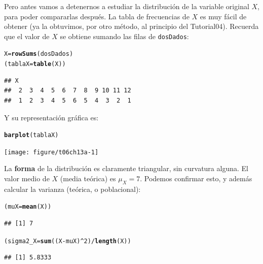 \documentclass[10pt,a4paper]{article}\usepackage[]{graphicx}\usepackage[]{color}
\makeatletter
\newcommand{\hlnum}[1]{\textcolor[rgb]{0.686,0.059,0.569}{#1}}%
\newcommand{\hlopt}[1]{\textcolor[rgb]{0,0,0}{#1}}%
\newcommand{\hlstd}[1]{\textcolor[rgb]{0.345,0.345,0.345}{#1}}%
\newcommand{\hlkwb}[1]{\textcolor[rgb]{0.69,0.353,0.396}{#1}}%
\newcommand{\hlkwd}[1]{\textcolor[rgb]{0.737,0.353,0.396}{\textbf{#1}}}%
\newenvironment{kframe}{%
 \def\at@end@of@kframe{}%
 \ifinner\ifhmode%
  \def\at@end@of@kframe{\end{minipage}}%
  \begin{minipage}{\columnwidth}%
 \fi\fi%
 \def\FrameCommand##1{\hskip\@totalleftmargin \hskip-\fboxsep
 \colorbox{shadecolor}{##1}\hskip-\fboxsep
     \hskip-\linewidth \hskip-\@totalleftmargin \hskip\columnwidth}%
 \MakeFramed {\advance\hsize-\width
   \@totalleftmargin\z@ \linewidth\hsize
   \@setminipage}}%
 {\par\unskip\endMakeFramed%
 \at@end@of@kframe}
\newenvironment{knitrout}{}{} %
\makeatother
\begin{document}
Pero antes vamos a detenernos a estudiar la distribución de la variable original $X$, para poder compararlas después. La tabla de frecuencias de $X$ es muy fácil de obtener (ya la obtuvimos, por otro método, al principio del Tutorial04). Recuerda que el valor de $X$ se obtiene sumando las filas de {\tt dosDados}:
\begin{knitrout}
\color{fgcolor}\begin{kframe}
\begin{alltt}
\hlstd{X} \hlkwb{=} \hlkwd{rowSums}\hlstd{(dosDados)}
\hlstd{(tablaX} \hlkwb{=} \hlkwd{table}\hlstd{(X))}
\end{alltt}
\begin{verbatim}
## X
##  2  3  4  5  6  7  8  9 10 11 12 
##  1  2  3  4  5  6  5  4  3  2  1
\end{verbatim}
\end{kframe}
\end{knitrout}
Y su representación gráfica es:
\begin{knitrout}
\color{fgcolor}\begin{kframe}
\begin{alltt}
\hlkwd{barplot}\hlstd{(tablaX)}
\end{alltt}
\end{kframe}
\texttt{[image: figure/t06ch13a-1]} 

\end{knitrout}
La {\bf forma} de la distribución es claramente triangular, sin curvatura alguna. El valor medio de $X$ (media teórica) es $\mu_X = 7$. Podemos confirmar esto, y además calcular la varianza (teórica, o poblacional):
\begin{knitrout}
\color{fgcolor}\begin{kframe}
\begin{alltt}
\hlstd{(muX} \hlkwb{=} \hlkwd{mean}\hlstd{(X))}
\end{alltt}
\begin{verbatim}
## [1] 7
\end{verbatim}
\begin{alltt}
\hlstd{(sigma2_X} \hlkwb{=} \hlkwd{sum}\hlstd{((X} \hlopt{-} \hlstd{muX)}\hlopt{^}\hlnum{2}\hlstd{)}\hlopt{/}\hlkwd{length}\hlstd{(X))}
\end{alltt}
\begin{verbatim}
## [1] 5.8333
\end{verbatim}
\end{kframe}
\end{knitrout}
\end{document}
